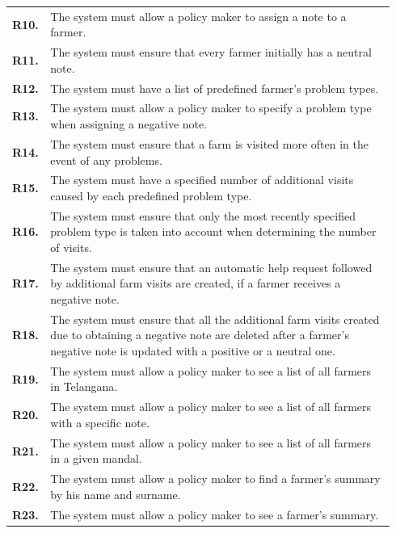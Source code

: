 \begin{longtable}{@{}p{0.06\linewidth} p{0.88\linewidth}}
		\textbf{R10.} & The system must allow a policy maker to assign a note to a farmer.\\
		\textbf{R11.} & The system must ensure that every farmer initially has a neutral note.\\
		\textbf{R12.} & The system must have a list of predefined farmer's problem types.\\
        \textbf{R13.} & The system must allow a policy maker to specify a problem type when assigning a negative note.\\
        \textbf{R14.} & The system must ensure that a farm is visited more often in the event of any problems.\\
        \textbf{R15.} & The system must have a specified number of additional visits caused by each predefined problem type.\\
        \textbf{R16.} & The system must ensure that only the most recently specified problem type is taken into account when determining the number of visits.\\
		\textbf{R17.} & The system must ensure that an automatic help request followed by additional farm visits are created, if a farmer receives a negative note.\\
		\textbf{R18.} & The system must ensure that all the additional farm visits created due to obtaining a negative note are deleted after a farmer's negative note is updated with a positive or a neutral one.\\
		\textbf{R19.} & The system must allow a policy maker to see a list of all farmers in Telangana.\\
		\textbf{R20.} & The system must allow a policy maker to see a list of all farmers with a specific note.\\
		\textbf{R21.} & The system must allow a policy maker to see a list of all farmers in a given mandal.\\
		\textbf{R22.} & The system must allow a policy maker to find a farmer's summary by his name and surname.\\
		\textbf{R23.} & The system must allow a policy maker to see a farmer's summary.\\
		

\end{longtable}
